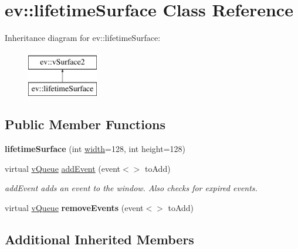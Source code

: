 \hypertarget{classev_1_1lifetimeSurface}{}\section{ev\+:\+:lifetime\+Surface Class Reference}
\label{classev_1_1lifetimeSurface}
Inheritance diagram for ev\+:\+:lifetime\+Surface\+:\begin{figure}[H]
\begin{center}
\leavevmode
\includegraphics[height=2.000000cm]{classev_1_1lifetimeSurface}
\end{center}
\end{figure}
\subsection*{Public Member Functions}
\begin{DoxyCompactItemize}
\item 
{\bfseries lifetime\+Surface} (int \hyperlink{classev_1_1vSurface2_a1aa8027816352a15d5b9bf1f26f48e76}{width}=128, int height=128)\hypertarget{classev_1_1lifetimeSurface_a8276286d48b5baf2829268333f99b482}{}\label{classev_1_1lifetimeSurface_a8276286d48b5baf2829268333f99b482}

\item 
virtual \hyperlink{classev_1_1vQueue}{v\+Queue} \hyperlink{classev_1_1lifetimeSurface_a8fce037a13281c0e46c7d660e0ea2275}{add\+Event} (event$<$$>$ to\+Add)
\begin{DoxyCompactList}\small\item\em add\+Event adds an event to the window. Also checks for expired events. \end{DoxyCompactList}\item 
virtual \hyperlink{classev_1_1vQueue}{v\+Queue} {\bfseries remove\+Events} (event$<$$>$ to\+Add)\hypertarget{classev_1_1lifetimeSurface_a86fde904d007b5b1e5f52351bfab0b17}{}\label{classev_1_1lifetimeSurface_a86fde904d007b5b1e5f52351bfab0b17}

\end{DoxyCompactItemize}
\subsection*{Additional Inherited Members}


